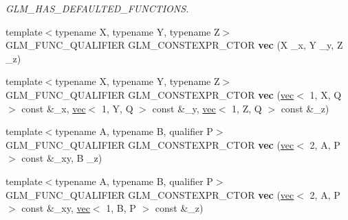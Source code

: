 \begin{DoxyCompactItemize}
\begin{DoxyCompactList}\small\item\em G\+L\+M\+\_\+\+H\+A\+S\+\_\+\+D\+E\+F\+A\+U\+L\+T\+E\+D\+\_\+\+F\+U\+N\+C\+T\+I\+O\+NS. \end{DoxyCompactList}\item 
\mbox{\label{structglm_1_1vec_3_013_00_01T_00_01Q_01_4_a9bc7a2c03248c036f1edcd4d4d3e3e90}} 
{\footnotesize template$<$typename X, typename Y, typename Z$>$ }\\G\+L\+M\+\_\+\+F\+U\+N\+C\+\_\+\+Q\+U\+A\+L\+I\+F\+I\+ER G\+L\+M\+\_\+\+C\+O\+N\+S\+T\+E\+X\+P\+R\+\_\+\+C\+T\+OR {\bfseries vec} (X \+\_\+x, Y \+\_\+y, Z \+\_\+z)
\item 
\mbox{\label{structglm_1_1vec_3_013_00_01T_00_01Q_01_4_ae438a8844a761acd9174ec18eea6de5a}} 
{\footnotesize template$<$typename X, typename Y, typename Z$>$ }\\G\+L\+M\+\_\+\+F\+U\+N\+C\+\_\+\+Q\+U\+A\+L\+I\+F\+I\+ER G\+L\+M\+\_\+\+C\+O\+N\+S\+T\+E\+X\+P\+R\+\_\+\+C\+T\+OR {\bfseries vec} (\hyperlink{structglm_1_1vec}{vec}$<$ 1, X, Q $>$ const \&\+\_\+x, \hyperlink{structglm_1_1vec}{vec}$<$ 1, Y, Q $>$ const \&\+\_\+y, \hyperlink{structglm_1_1vec}{vec}$<$ 1, Z, Q $>$ const \&\+\_\+z)
\item 
\mbox{\label{structglm_1_1vec_3_013_00_01T_00_01Q_01_4_a611e956498c0d144b8ba94638e86fca9}} 
{\footnotesize template$<$typename A, typename B, qualifier P$>$ }\\G\+L\+M\+\_\+\+F\+U\+N\+C\+\_\+\+Q\+U\+A\+L\+I\+F\+I\+ER G\+L\+M\+\_\+\+C\+O\+N\+S\+T\+E\+X\+P\+R\+\_\+\+C\+T\+OR {\bfseries vec} (\hyperlink{structglm_1_1vec}{vec}$<$ 2, A, P $>$ const \&\+\_\+xy, B \+\_\+z)
\item 
\mbox{\label{structglm_1_1vec_3_013_00_01T_00_01Q_01_4_ae95dab82b1cb879409d72da36d6c6005}} 
{\footnotesize template$<$typename A, typename B, qualifier P$>$ }\\G\+L\+M\+\_\+\+F\+U\+N\+C\+\_\+\+Q\+U\+A\+L\+I\+F\+I\+ER G\+L\+M\+\_\+\+C\+O\+N\+S\+T\+E\+X\+P\+R\+\_\+\+C\+T\+OR {\bfseries vec} (\hyperlink{structglm_1_1vec}{vec}$<$ 2, A, P $>$ const \&\+\_\+xy, \hyperlink{structglm_1_1vec}{vec}$<$ 1, B, P $>$ const \&\+\_\+z)
\item 

\end{DoxyCompactItemize}
